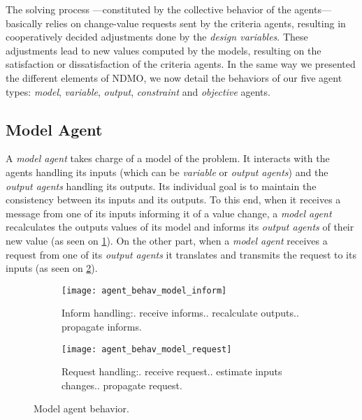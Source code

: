 The solving process ---constituted by the collective behavior of the agents--- basically relies on change-value requests sent by the criteria agents, resulting in cooperatively decided adjustments done by the \emph{design variables}. These adjustments lead to new values computed by the models, resulting on the satisfaction or dissatisfaction of the criteria agents. 
In the same way we presented the different elements of NDMO, we now detail the behaviors of our five agent types: \emph{model}, \emph{variable}, \emph{output}, \emph{constraint} and \emph{objective} agents.

\subsection{Model Agent}

A \emph{model agent} takes charge of a model of the problem. It interacts with the agents handling its inputs (which can be \emph{variable} or \emph{output agents}) and the \emph{output agents} handling its outputs. Its individual goal is to maintain the consistency between its inputs and its outputs. To this end, when it receives a message from one of its inputs informing it of a value change, a \emph{model agent} recalculates the outputs values of its model and informs its \emph{output agents} of their new value (as seen on \figurename{} \ref{agent_behav_model:inf}). On the other part, when a \emph{model agent} receives a request from one of its \emph{output agents} it translates and transmits the request to its inputs (as seen on \figurename{} \ref{agent_behav_model:req}). 

\begin{figure}
\centering
\begin{subfigure}{0.35\textwidth}
		\centering
		\texttt{[image: agent\_behav\_model\_inform]}
		\caption{Inform handling:. receive informs.. recalculate outputs.. propagate informs.}\label{agent_behav_model:inf}
\end{subfigure}
\qquad
\begin{subfigure}{0.35\textwidth}
		\centering
		\texttt{[image: agent\_behav\_model\_request]}
		\caption{Request handling:. receive request.. estimate inputs changes.. propagate request.}\label{agent_behav_model:req}
\end{subfigure}
\caption{Model agent behavior.}\label{agent_behav_model}
\end{figure}

